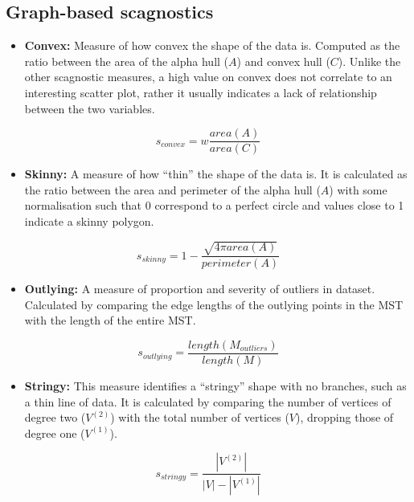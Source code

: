 \hypertarget{graph-based-scagnostics}{%
\subsection{Graph-based scagnostics}\label{graph-based-scagnostics}}

\begin{itemize}
\tightlist
\item
  \textbf{Convex:} Measure of how convex the shape of the data is.
  Computed as the ratio between the area of the alpha hull (\(A\)) and
  convex hull (\(C\)). Unlike the other scagnostic measures, a high
  value on convex does not correlate to an interesting scatter plot,
  rather it usually indicates a lack of relationship between the two
  variables.
\end{itemize}

\[s_{convex}=w\frac{area(A)}{area(C)}\]

\begin{itemize}
\tightlist
\item
  \textbf{Skinny:} A measure of how ``thin'' the shape of the data is.
  It is calculated as the ratio between the area and perimeter of the
  alpha hull (\(A\)) with some normalisation such that 0 correspond to a
  perfect circle and values close to 1 indicate a skinny polygon.
\end{itemize}

\[s_{skinny}= 1-\frac{\sqrt{4\pi area(A)}}{perimeter(A)}\]

\begin{itemize}
\tightlist
\item
  \textbf{Outlying:} A measure of proportion and severity of outliers in
  dataset. Calculated by comparing the edge lengths of the outlying
  points in the MST with the length of the entire MST.
\end{itemize}

\[s_{outlying}=\frac{length(M_{outliers})}{length(M)}\]

\begin{itemize}
\tightlist
\item
  \textbf{Stringy:} This measure identifies a ``stringy'' shape with no
  branches, such as a thin line of data. It is calculated by comparing
  the number of vertices of degree two (\(V^{(2)}\)) with the total
  number of vertices (\(V\)), dropping those of degree one
  (\(V^{(1)}\)).
\end{itemize}

\[s_{stringy} = \frac{|V^{(2)}|}{|V|-|V^{(1)}|}\]


